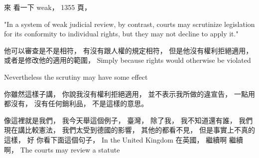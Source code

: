 \hypertarget{w06:cue:666}{}來 看一下 weak，
\hypertarget{w06:cue:667}{}1355 頁，

\hypertarget{w06:cue:668}{}"In a system of weak judicial review, by contrast, courts may scrutinize legislation for its conformity to individual rights, but they may not decline to apply it."

\hypertarget{w06:cue:669}{}他可以審查是不是相符，
\hypertarget{w06:cue:670}{}有沒有跟人權的規定相符，
\hypertarget{w06:cue:671}{}但是他沒有權利拒絕適用，
\hypertarget{w06:cue:672}{}或者是修改他的適用的範圍，
\hypertarget{w06:cue:673}{}Simply because rights would otherwise be violated

\hypertarget{w06:cue:674}{}Nevertheless the scrutiny may have some effect

\hypertarget{w06:cue:675}{}你雖然這樣子講，
\hypertarget{w06:cue:676}{}你說我沒有權利拒絕適用，
\hypertarget{w06:cue:677}{}並不表示我所做的違宣告，
\hypertarget{w06:cue:678}{}一點用都沒有，
\hypertarget{w06:cue:679}{}沒有任何銷利品，
\hypertarget{w06:cue:680}{}不是這樣的意思。

\hypertarget{w06:cue:681}{}像這裡就是我們，
\hypertarget{w06:cue:682}{}我今天舉這個例子，
\hypertarget{w06:cue:683}{}臺灣，
\hypertarget{w06:cue:684}{}除了我，
\hypertarget{w06:cue:685}{}我不知道還有誰，
\hypertarget{w06:cue:686}{}我們現在講比較憲法，
\hypertarget{w06:cue:687}{}我們太受到德國的影響，
\hypertarget{w06:cue:688}{}其他的都看不見，
\hypertarget{w06:cue:689}{}但是事實上不真的這樣，
\hypertarget{w06:cue:690}{}好 你看下面這個句子，
\hypertarget{w06:cue:691}{}In the United Kingdom
\hypertarget{w06:cue:692}{}在英國，
\hypertarget{w06:cue:693}{}繼續啊 繼續啊，
\hypertarget{w06:cue:694}{}The courts may review a statute

